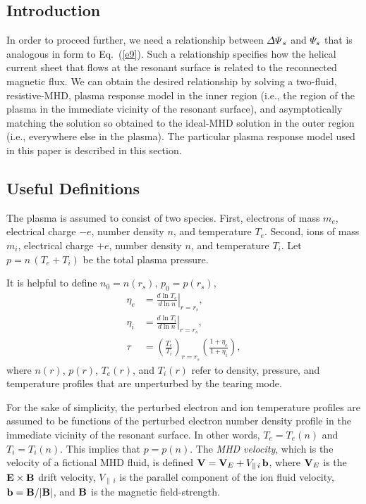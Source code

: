 \documentclass[12pt,prb,aps]{revtex4-1}
\begin{document}
\subsection{Introduction}
In order to proceed further, we need a relationship between ${\mit\Delta\Psi}_s$ and ${\mit\Psi}_s$ that
is analogous in form to Eq.~(\ref{e9}). Such a relationship specifies how the helical current sheet that
flows at the resonant surface is related to the reconnected magnetic flux. 
We can obtain the desired relationship  by solving  a two-fluid, resistive-MHD, plasma response model
in the inner region (i.e., the region of the plasma in the immediate vicinity of the resonant surface), 
and asymptotically matching the solution so obtained to the ideal-MHD solution in the outer region (i.e., everywhere else in the plasma). The particular 
plasma response model used in this paper is
described in this section. 

\subsection{Useful Definitions}
The plasma is assumed to consist of two species. First, electrons of mass $m_e$, electrical charge $-e$, 
number density $n$, and temperature $T_e$.  Second, ions of mass $m_i$, electrical charge $+e$,  
number density $n$, and temperature $T_i$. Let $p=n\,(T_e+T_i)$ be the total plasma pressure. 

It is helpful to define $n_0 = n(r_s)$, $p_0= p(r_s)$,
\begin{align}
\eta_e &=\left.\frac{d\ln T_e}{d\ln n}\right|_{r=r_s},\label{e211}\\[0.5ex]
\eta_i &= \left.\frac{d\ln T_i}{d\ln n}\right|_{r=r_s},\\[0.5ex]
\tau &= \left(\frac{T_e}{T_i}\right)_{r=r_s}\left(\frac{1+\eta_e}{1+\eta_i}\right),\label{e213}
\end{align}
where $n(r)$, $p(r)$, $T_e(r)$, and $T_i(r)$ refer to
density, pressure, and temperature profiles that are unperturbed by the tearing mode. 

For the sake of simplicity, the perturbed electron and ion temperature profiles are assumed to be functions of
the perturbed electron number density profile in the immediate vicinity of the resonant surface. In other words, $T_e=T_e(n)$ and $T_i=T_i(n)$. This
implies that $p=p(n)$. 
The {\em MHD velocity}, which is the velocity of a
fictional MHD fluid, is defined ${\bf V}={\bf V}_E + V_{\parallel\,i}\,{\bf b}$, where ${\bf V}_E$ is the
${\bf E}\times{\bf B}$ drift velocity, $V_{\parallel\,i}$ is the parallel component of the ion fluid
velocity, ${\bf b}= {\bf B}/|{\bf B}|$, and ${\bf B}$ is the magnetic field-strength.
\end{document}
